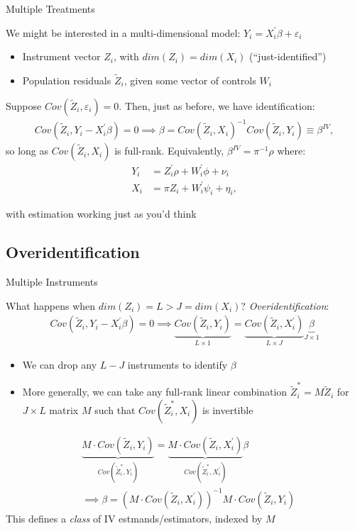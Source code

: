 \documentclass{beamer}
\begin{document}
\begin{frame}{Multiple Treatments}

We might be interested in a multi-dimensional model: $Y_i=X_i^\prime\beta+\varepsilon_i$
\begin{itemize}
\item Instrument vector $Z_i$, with $dim(Z_i)=dim(X_i)$ (``just-identified'')
\item Population residuals $\tilde{Z}_i$, given some vector of controls $W_i$
\end{itemize}\medskip\pause{}
Suppose $Cov(\tilde{Z}_i,\varepsilon_i)=0$. Then, just as before, we have identification:
\begin{align*}
Cov(\tilde{Z}_i,Y_i-X_i^\prime\beta)=0 \implies \beta = Cov(\tilde{Z}_i,X_i)^{-1}Cov(\tilde{Z}_i,Y_i)\equiv \beta^{IV},
\end{align*}
so long as $Cov(\tilde{Z}_i,X_i)$ is full-rank.\pause{} Equivalently, $\beta^{IV}=\pi^{-1}\rho$ where:
\vspace{-0.2cm}
\begin{align*}
Y_i&=Z_i^\prime\rho + W_i^\prime\phi+\nu_i\\
X_i&=\pi Z_i+W_i^\prime\psi_i+\eta_i,
\end{align*}

\vspace{-0.3cm}
with estimation working just as you'd think
\end{frame}

\subsection{Overidentification}

\begin{frame}{Multiple Instruments}

What happens when $dim(Z_i)=L>J=dim(X_i)$? \emph{Overidentification}:
\vspace{-0.2cm}
\begin{align*}
Cov(\tilde{Z}_i,Y_i-X_i^\prime\beta)=0 \implies \underbrace{Cov(\tilde{Z}_i,Y_i)}_{L\times 1}=\underbrace{Cov(\tilde{Z}_i,X_i^\prime)}_{L\times J}\underbrace{\beta}_{J\times 1}
\end{align*}
\vspace{-0.5cm}
\begin{itemize}
\item We can drop any $L-J$ instruments to identify $\beta$\pause{}
\item More generally, we can take any full-rank linear combination $\tilde{Z}_i^*=M\tilde{Z}_i$ for $J\times L$ matrix $M$ such that $Cov(\tilde{Z}_i^*,X_i)$ is invertible
\end{itemize}
\vspace{-0.3cm}
\begin{align*}
&\underbrace{M\cdot Cov (\tilde{Z}_i,Y_i)}_{Cov(\tilde{Z}_i^*,Y_i)}=\underbrace{M\cdot Cov(\tilde{Z}_i,X_i^\prime)}_{Cov(\tilde{Z}_i^*,X_i^\prime)}\beta\\
&\implies \beta = \left(M\cdot Cov(\tilde{Z}_i,X_i^\prime)\right)^{-1} M\cdot Cov(\tilde{Z}_i,Y_i)
\end{align*}\pause{}
This defines a \emph{class} of IV estmands/estimators, indexed by $M$
\end{frame}
\end{document}
